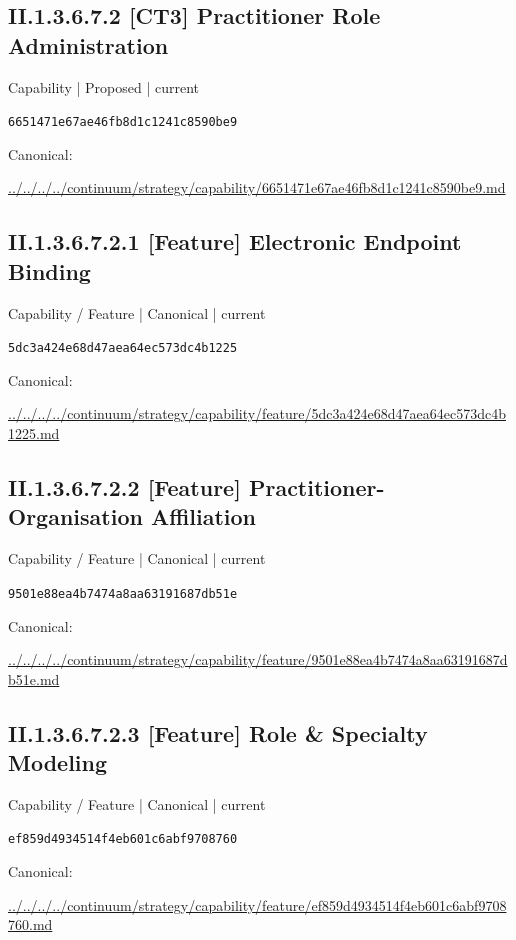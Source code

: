 \documentclass[10pt,a4paper]{article}
\begin{document}
\subsection*{II.1.3.6.7.2 [CT3] Practitioner Role Administration}
{\small Capability | Proposed | current}\par
\texttt{6651471e67ae46fb8d1c1241c8590be9}\par
Canonical: \par
{\footnotesize\url{../../../../continuum/strategy/capability/6651471e67ae46fb8d1c1241c8590be9.md}}\par
\subsection*{II.1.3.6.7.2.1 [Feature] Electronic Endpoint Binding}
{\small Capability / Feature | Canonical | current}\par
\texttt{5dc3a424e68d47aea64ec573dc4b1225}\par
Canonical: \par
{\footnotesize\url{../../../../continuum/strategy/capability/feature/5dc3a424e68d47aea64ec573dc4b1225.md}}\par
\subsection*{II.1.3.6.7.2.2 [Feature] Practitioner-Organisation Affiliation}
{\small Capability / Feature | Canonical | current}\par
\texttt{9501e88ea4b7474a8aa63191687db51e}\par
Canonical: \par
{\footnotesize\url{../../../../continuum/strategy/capability/feature/9501e88ea4b7474a8aa63191687db51e.md}}\par
\subsection*{II.1.3.6.7.2.3 [Feature] Role \& Specialty Modeling}
{\small Capability / Feature | Canonical | current}\par
\texttt{ef859d4934514f4eb601c6abf9708760}\par
Canonical: \par
{\footnotesize\url{../../../../continuum/strategy/capability/feature/ef859d4934514f4eb601c6abf9708760.md}}\par
\end{document}

